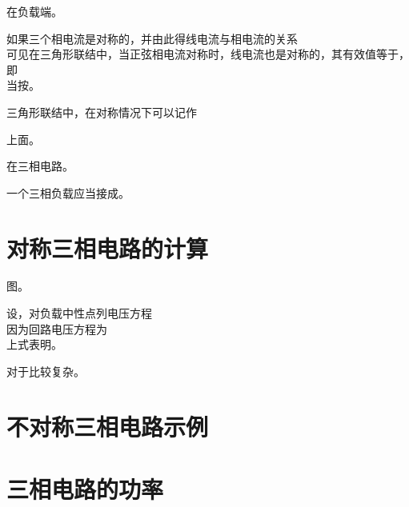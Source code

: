 在负载端。

如果三个相电流是对称的，并由此得线电流与相电流的关系
\[
\]
可见在三角形联结中，当正弦相电流对称时，线电流也是对称的，其有效值等于，即
\[
\]
当按。

三角形联结中，在对称情况下可以记作
\[
\]

上面。

在三相电路。

一个三相负载应当接成。

\section{对称三相电路的计算}
图。

设，对负载中性点列电压方程
\[
\]
因为回路电压方程为
\[
\]
上式表明。

对于比较复杂。

\section{不对称三相电路示例}

\section{三相电路的功率}

\endinput